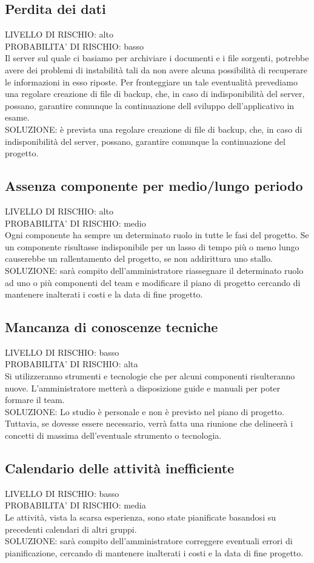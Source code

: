 \documentclass[11pt,a4paper]{article}
\begin{document}
\subsection{Perdita dei dati}
LIVELLO DI RISCHIO: alto \\
PROBABILITA' DI RISCHIO: basso \\
Il server sul quale ci basiamo per archiviare i documenti e i file sorgenti, potrebbe avere dei problemi di instabilità tali da non avere alcuna possibilità di recuperare le informazioni in esso riposte. 
Per fronteggiare un tale eventualità prevediamo una regolare creazione di file di backup, che, in caso di indisponibilità del server, possano, garantire comunque la continuazione dell sviluppo dell'applicativo in esame. \\
SOLUZIONE: è prevista una regolare creazione di file di backup, che, in caso di indisponibilità del server, possano, garantire comunque la continuazione del progetto.
\subsection{Assenza componente per medio/lungo periodo}
LIVELLO DI RISCHIO: alto \\
PROBABILITA' DI RISCHIO: medio \\
Ogni componente ha sempre un determinato ruolo in tutte le fasi del progetto.
Se un componente risultasse indisponibile per un lasso di tempo più o meno lungo causerebbe un rallentamento del progetto, se non addirittura uno stallo. \\
SOLUZIONE: sarà compito dell'amministratore riassegnare il determinato ruolo ad uno o più componenti del team e modificare il piano di progetto cercando di mantenere inalterati i costi e la data di fine progetto.
\subsection{Mancanza di conoscenze tecniche}
LIVELLO DI RISCHIO: basso \\
PROBABILITA' DI RISCHIO: alta \\
Si utilizzeranno strumenti e tecnologie che per alcuni componenti risulteranno nuove.
L'amministratore metterà a disposizione guide e manuali per poter formare il team. \\
SOLUZIONE: Lo studio è personale e non è previsto nel piano di progetto.
Tuttavia, se dovesse essere necessario, verrà fatta una riunione che delineerà i concetti di massima dell'eventuale strumento o tecnologia.
\subsection{Calendario delle attività inefficiente}
LIVELLO DI RISCHIO: basso \\
PROBABILITA' DI RISCHIO: media \\
Le attività, vista la scarsa esperienza, sono state pianificate basandosi su precedenti calendari di altri gruppi. \\
SOLUZIONE: sarà compito dell'amministratore correggere eventuali errori di pianificazione, cercando di mantenere inalterati i costi e la data di fine progetto.
\end{document}
